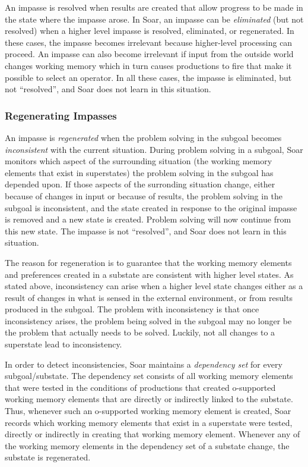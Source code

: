 An impasse is resolved when results are created that allow progress to
be made in the state where the impasse arose.  In Soar, an impasse can be
\textit{eliminated} (but not resolved) when a higher level impasse is
resolved, eliminated, or regenerated.  In these cases, the impasse
becomes irrelevant because higher-level processing can proceed.  An
impasse can also become irrelevant if input from the outside world
changes working memory which in turn causes productions to fire that
make it possible to select an operator.  In all these cases, the impasse
is eliminated, but not ``resolved'', and Soar does not learn in this
situation.

\subsubsection*{Regenerating Impasses}

An impasse is \textit{regenerated} when the problem solving in the
subgoal becomes {\em inconsistent} with the current situation.  During
problem solving in a subgoal, Soar monitors which aspect of the
surrounding situation (the working memory elements that exist in
superstates) the problem solving in the subgoal has depended upon.  If
those aspects of the surronding situation change, either because of
changes in input or because of results, the problem solving in the
subgoal is inconsistent, and the state created in response to the
original impasse is removed and a new state is created. Problem solving
will now continue from this new state.  The impasse is not ``resolved'',
and Soar does not learn in this situation.

The reason for regeneration is to guarantee that the working memory
elements and preferences created in a substate are consistent with
higher level states.  As stated above, inconsistency can arise when a
higher level state changes either as a result of changes in what is
sensed in the external environment, or from results produced in the
subgoal.  The problem with inconsistency is that once inconsistency
arises, the problem being solved in the subgoal may no longer be the
problem that actually needs to be solved.  Luckily, not all changes to a
superstate lead to inconsistency.

In order to detect inconsistencies, Soar maintains a {\em dependency set}
for every subgoal/substate.  The dependency set consists of all working
memory elements that were tested in the conditions of productions that
created o-supported working memory elements that are directly or
indirectly linked to the substate.  Thus, whenever such an o-supported
working memory element is created, Soar records which working memory
elements that exist in a superstate were tested, directly or indirectly
in creating that working memory element.  Whenever
any of the working memory elements in the dependency set of a substate
change, the substate is regenerated.

